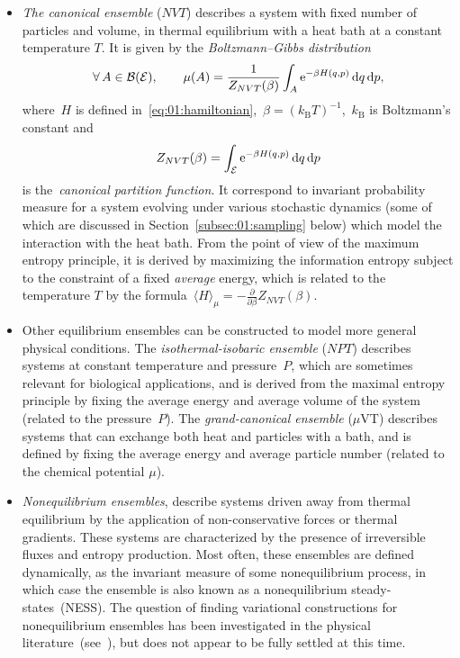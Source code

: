 \begin{itemize}
    \item{\textit{The canonical ensemble} ($NVT$) describes a system with fixed number of particles and volume, in thermal equilibrium with a heat bath at a constant temperature $T$. It is given by the \textit{Boltzmann--Gibbs distribution}
    \begin{equation}
        \label{eq:01:boltzmann_gibbs}
        \forall\,A\in\mathcal B(\mathcal{E}),\qquad \mu(A) = \frac{1}{Z_{NVT}(\beta)}\int_{A}\mathrm{e}^{-\beta H(q,p)}\,\mathrm{d} q\,\mathrm{d} p,
    \end{equation}
    where~$H$ is defined in~\eqref{eq:01:hamiltonian},~$\beta = (k_{\mathrm{B}}T)^{-1}$,~$k_{\mathrm{B}}$ is Boltzmann's constant and
    \[
    Z_{NVT}(\beta) = \int_{\mathcal{E}}\mathrm{e}^{-\beta H(q,p)}\,\mathrm{d} q\,\mathrm{d} p
    \]
    is the~\textit{canonical partition function}.
    It correspond to invariant probability measure for a system evolving under various stochastic dynamics (some of which are discussed in Section~\ref{subsec:01:sampling} below) which model the interaction with the heat bath. From the point of view of the maximum entropy principle, it is derived by maximizing the information entropy subject to the constraint of a fixed \textit{average} energy, which is related to the temperature $T$ by the formula~${\langle H\rangle_\mu = -\frac{\partial}{\partial\beta}Z_{NVT}(\beta)}$. }
    \item{Other equilibrium ensembles can be constructed to model more general physical conditions. The \textit{isothermal-isobaric ensemble} ($NPT$) describes systems at constant temperature and pressure~$P$, which are sometimes relevant for biological applications, and is derived from the maximal entropy principle by fixing the average energy and average volume of the system (related to the pressure~$P$). The \textit{grand-canonical ensemble} ($\mu$VT) describes systems that can exchange both heat and particles with a bath, and is defined by fixing the average energy and average particle number (related to the chemical potential $\mu$).}
    \item{\textit{Nonequilibrium ensembles}, describe systems driven away from thermal equilibrium by the application of non-conservative forces or thermal gradients. These systems are characterized by the presence of irreversible fluxes and entropy production. Most often, these ensembles are defined dynamically, as the invariant measure of some nonequilibrium process, in which case the ensemble is also known as a nonequilibrium steady-states~(NESS). The question of finding variational constructions for nonequilibrium ensembles has been investigated in the physical literature~(see~\cite{J80}), but does not appear to be fully settled at this time.}
\end{itemize}
